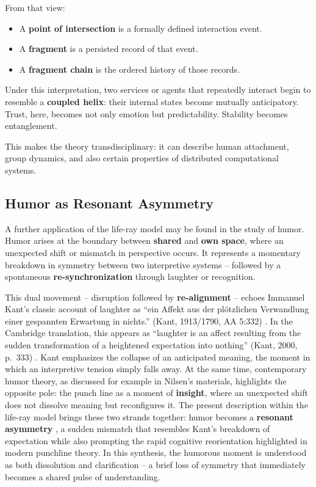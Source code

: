From that view:
\begin{itemize}
    \item A \textbf{point of intersection} is a formally defined interaction event.
    \item A \textbf{fragment} is a persisted record of that event.
    \item A \textbf{fragment chain} is the ordered history of those records.
\end{itemize}

Under this interpretation, two services or agents that repeatedly interact begin to resemble a \textbf{coupled helix}: their internal states become mutually anticipatory.
Trust, here, becomes not only emotion but predictability. Stability becomes entanglement.

This makes the theory transdisciplinary: it can describe human attachment, group dynamics, and also certain properties of distributed computational systems.

\subsection{Humor as Resonant Asymmetry}

A further application of the life-ray model may be found in the study of humor.
Humor arises at the boundary between \textbf{shared} and \textbf{own space},
where an unexpected shift or mismatch in perspective occurs.
It represents a momentary breakdown in symmetry between two interpretive systems --
followed by a spontaneous \textbf{re-synchronization} through laughter or recognition.

This dual movement -- disruption followed by \textbf{re-alignment}   -- echoes Immanuel Kant’s classic account of laughter as
“ein Affekt aus der plötzlichen Verwandlung einer gespannten Erwartung in nichts.” (Kant, 1913/1790, AA 5:332) \cite{kant1913aa5}.
In the Cambridge translation, this appears as “laughter is an affect resulting from
the sudden transformation of a heightened expectation into nothing” (Kant, 2000, p.~333) \cite{kant2000cambridge}.
Kant emphasizes the collapse of an anticipated meaning, the moment in which an interpretive tension simply falls away.
At the same time, contemporary humor theory, as discussed for example in Nilsen’s materials,
highlights the opposite pole: the punch line as a moment of \textbf{insight},
where an unexpected shift does not dissolve meaning but reconfigures it.
The present description within the life-ray model brings these two strands together:
humor becomes a \textbf{resonant asymmetry} , a sudden mismatch that resembles Kant’s
breakdown of expectation while also prompting the rapid cognitive reorientation
highlighted in modern punchline theory. In this synthesis, the humorous moment is
understood as both dissolution and clarification -- a brief loss of symmetry that
immediately becomes a shared pulse of understanding.

